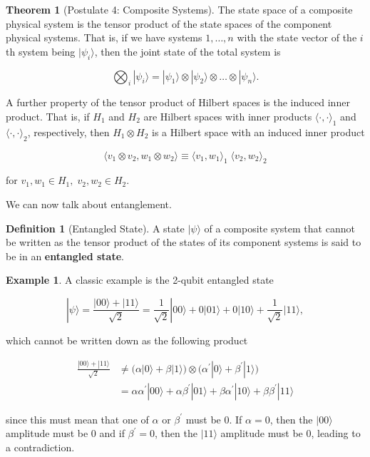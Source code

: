 \documentclass{article}
\theoremstyle{definition}
\newtheorem{theorem}{Theorem}[section]
\newtheorem{example}{Example}[section]
\newtheorem{definition}{Definition}[section]
\begin{document}
    \begin{theorem}[Postulate 4: Composite Systems]

      The state space of a composite physical system is the tensor product of the state spaces of the component physical systems. That is, if we have systems $1, \ldots, n$ with the state vector of the $i$th system being $|\psi_i \rangle$, then the joint state of the total system is

        \[\bigotimes_i |\psi_i \rangle = |\psi_1 \rangle \otimes |\psi_2 \rangle \otimes \ldots \otimes |\psi_n \rangle.\]
    \end{theorem}

    A further property of the tensor product of Hilbert spaces is the induced inner product. That is, if $H_1$ and $H_2$ are Hilbert spaces with inner products $\langle \cdot, \cdot \rangle_1$ and $\langle \cdot, \cdot \rangle_2$, respectively, then $H_1 \otimes H_2$ is a Hilbert space with an induced inner product

      \[\langle v_1 \otimes v_2 , w_1 \otimes w_2 \rangle \equiv \langle v_1, w_1\rangle_1 \; \langle v_2, w_2 \rangle_2\]

    for $v_1, w_1 \in H_1, \; v_2, w_2 \in H_2$. 

    We can now talk about entanglement. 

    \begin{definition}[Entangled State]
      A state $|\psi\rangle$ of a composite system that cannot be written as the tensor product of the states of its component systems is said to be in an \textbf{entangled state}.   
    \end{definition}

    \begin{example}
      A classic example is the 2-qubit entangled state

        \[|\psi \rangle = \frac{|00\rangle + |11 \rangle}{\sqrt{2}} = \frac{1}{\sqrt{2}} |00\rangle + 0 |01\rangle + 0 |10\rangle + \frac{1}{\sqrt{2}} |11\rangle,\]

      which cannot be written down as the following product

      \begin{align*}
        \frac{|00\rangle + |11 \rangle}{\sqrt{2}} & \neq \big(\alpha |0\rangle + \beta |1\rangle \big) \otimes \big( \alpha^\prime |0 \rangle + \beta^\prime |1\rangle \big) \\
        & = \alpha \alpha^\prime |00\rangle + \alpha \beta^\prime |01\rangle + \beta \alpha^\prime |10\rangle + \beta \beta^\prime |11\rangle
      \end{align*}

      since this must mean that one of $\alpha$ or $\beta^\prime$ must be $0$. If $\alpha = 0$, then the $|00\rangle$ amplitude must be $0$ and if $\beta^\prime = 0$, then the $|11\rangle$ amplitude must be $0$, leading to a contradiction.
    \end{example}
\end{document}
